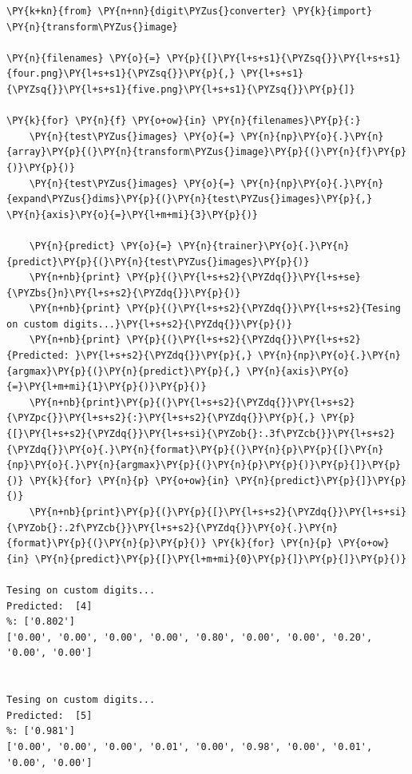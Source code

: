 \begin{codebox}[breakable, size=fbox, boxrule=1pt, pad at break*=1mm,colback=cellbackground, colframe=cellborder]
\begin{Verbatim}[commandchars=\\\{\}]
\PY{k+kn}{from} \PY{n+nn}{digit\PYZus{}converter} \PY{k}{import} \PY{n}{transform\PYZus{}image}
	
\PY{n}{filenames} \PY{o}{=} \PY{p}{[}\PY{l+s+s1}{\PYZsq{}}\PY{l+s+s1}{four.png}\PY{l+s+s1}{\PYZsq{}}\PY{p}{,} \PY{l+s+s1}{\PYZsq{}}\PY{l+s+s1}{five.png}\PY{l+s+s1}{\PYZsq{}}\PY{p}{]}
	
\PY{k}{for} \PY{n}{f} \PY{o+ow}{in} \PY{n}{filenames}\PY{p}{:}
    \PY{n}{test\PYZus{}images} \PY{o}{=} \PY{n}{np}\PY{o}{.}\PY{n}{array}\PY{p}{(}\PY{n}{transform\PYZus{}image}\PY{p}{(}\PY{n}{f}\PY{p}{)}\PY{p}{)}
    \PY{n}{test\PYZus{}images} \PY{o}{=} \PY{n}{np}\PY{o}{.}\PY{n}{expand\PYZus{}dims}\PY{p}{(}\PY{n}{test\PYZus{}images}\PY{p}{,} \PY{n}{axis}\PY{o}{=}\PY{l+m+mi}{3}\PY{p}{)}
	
    \PY{n}{predict} \PY{o}{=} \PY{n}{trainer}\PY{o}{.}\PY{n}{predict}\PY{p}{(}\PY{n}{test\PYZus{}images}\PY{p}{)}
    \PY{n+nb}{print} \PY{p}{(}\PY{l+s+s2}{\PYZdq{}}\PY{l+s+se}{\PYZbs{}n}\PY{l+s+s2}{\PYZdq{}}\PY{p}{)}
    \PY{n+nb}{print} \PY{p}{(}\PY{l+s+s2}{\PYZdq{}}\PY{l+s+s2}{Tesing on custom digits...}\PY{l+s+s2}{\PYZdq{}}\PY{p}{)}
    \PY{n+nb}{print} \PY{p}{(}\PY{l+s+s2}{\PYZdq{}}\PY{l+s+s2}{Predicted: }\PY{l+s+s2}{\PYZdq{}}\PY{p}{,} \PY{n}{np}\PY{o}{.}\PY{n}{argmax}\PY{p}{(}\PY{n}{predict}\PY{p}{,} \PY{n}{axis}\PY{o}{=}\PY{l+m+mi}{1}\PY{p}{)}\PY{p}{)}
    \PY{n+nb}{print}\PY{p}{(}\PY{l+s+s2}{\PYZdq{}}\PY{l+s+s2}{\PYZpc{}}\PY{l+s+s2}{:}\PY{l+s+s2}{\PYZdq{}}\PY{p}{,} \PY{p}{[}\PY{l+s+s2}{\PYZdq{}}\PY{l+s+si}{\PYZob{}:.3f\PYZcb{}}\PY{l+s+s2}{\PYZdq{}}\PY{o}{.}\PY{n}{format}\PY{p}{(}\PY{n}{p}\PY{p}{[}\PY{n}{np}\PY{o}{.}\PY{n}{argmax}\PY{p}{(}\PY{n}{p}\PY{p}{)}\PY{p}{]}\PY{p}{)} \PY{k}{for} \PY{n}{p} \PY{o+ow}{in} \PY{n}{predict}\PY{p}{]}\PY{p}{)}
    \PY{n+nb}{print}\PY{p}{(}\PY{p}{[}\PY{l+s+s2}{\PYZdq{}}\PY{l+s+si}{\PYZob{}:.2f\PYZcb{}}\PY{l+s+s2}{\PYZdq{}}\PY{o}{.}\PY{n}{format}\PY{p}{(}\PY{n}{p}\PY{p}{)} \PY{k}{for} \PY{n}{p} \PY{o+ow}{in} \PY{n}{predict}\PY{p}{[}\PY{l+m+mi}{0}\PY{p}{]}\PY{p}{]}\PY{p}{)}

Tesing on custom digits...
Predicted:  [4]
%: ['0.802']
['0.00', '0.00', '0.00', '0.00', '0.80', '0.00', '0.00', '0.20', '0.00', '0.00']


Tesing on custom digits...
Predicted:  [5]
%: ['0.981']
['0.00', '0.00', '0.00', '0.01', '0.00', '0.98', '0.00', '0.01', '0.00', '0.00']
\end{Verbatim}
\end{codebox}

